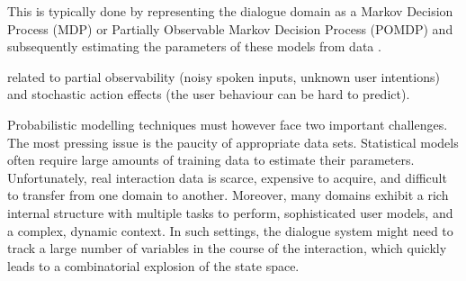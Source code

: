 This is typically done by representing the dialogue domain as a Markov Decision Process (MDP) or Partially Observable Markov Decision Process (POMDP) and subsequently estimating the parameters of these models from data \citep{Supelec270}. 

 related to partial observability (noisy spoken inputs, unknown user intentions) and stochastic action effects (the user behaviour can be hard to predict). 
 
  Probabilistic modelling techniques must however face two important challenges. The most pressing issue is the paucity of appropriate data sets.  Statistical models often require large amounts of training data to estimate their parameters. Unfortunately, real interaction data is scarce, expensive to acquire, and difficult to transfer from one domain to another.  Moreover, many domains exhibit a rich internal structure with multiple tasks to perform, sophisticated user models, and a complex, dynamic context.  In such settings, the dialogue system might need to track a large number of variables in the course of the interaction, which quickly leads to a combinatorial explosion of the state space.  
  
